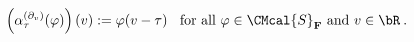 \begin{equation}\left(\alpha^{(\partial_v)}_\tau(\varphi)\right)(v) := \varphi(v-\tau)\:\:\:\:
  \mbox{for all $\varphi\in \CMcal{S}_{\bf F}$ and $v\in \bR$}\:.
  \end{equation}

